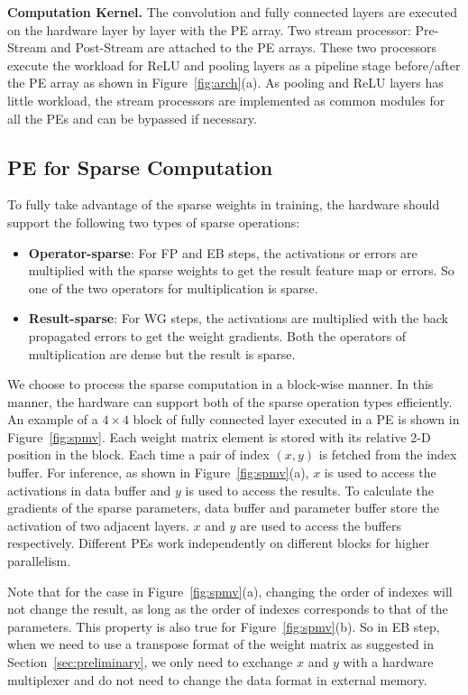 {\bf Computation Kernel.} The convolution and fully connected layers are executed on the hardware layer by layer with the PE array. Two stream processor: Pre-Stream and Post-Stream are attached to the PE arrays. These two processors execute the workload for ReLU and pooling layers as a pipeline stage before/after the PE array as shown in Figure~\ref{fig:arch}(a). As pooling and ReLU layers has little workload, the stream processors are implemented as common modules for all the PEs and can be bypassed if necessary.

\subsection{PE for Sparse Computation}\label{sec:hw_pe}

To fully take advantage of the sparse weights in training, the hardware should support the following two types of sparse operations:
\begin{itemize}
\item {\bf Operator-sparse}: For FP and EB steps, the activations or errors are multiplied with the sparse weights to get the result feature map or errors. So one of the two operators for multiplication is sparse.
\item {\bf Result-sparse}: For WG steps, the activations are multiplied with the back propagated errors to get the weight gradients. Both the operators of multiplication are dense but the result is sparse.
\end{itemize}

We choose to process the sparse computation in a block-wise manner. In this manner, the hardware can support both of the sparse operation types efficiently. An example of a $4\times 4$ block of fully connected layer executed in a PE is shown in Figure~\ref{fig:spmv}. Each weight matrix element is stored with its relative 2-D position in the block. Each time a pair of index $(x, y)$ is fetched from the index buffer. For inference, as shown in Figure~\ref{fig:spmv}(a), $x$ is used to access the activations in data buffer and $y$ is used to access the results. To calculate the gradients of the sparse parameters, data buffer and parameter buffer store the activation of two adjacent layers. $x$ and $y$ are used to access the buffers respectively. Different PEs work independently on different blocks for higher parallelism.

Note that for the case in Figure~\ref{fig:spmv}(a), changing the order of indexes will not change the result, as long as the order of indexes corresponds to that of the parameters. This property is also true for Figure~\ref{fig:spmv}(b). So in EB step, when we need to use a transpose format of the weight matrix as suggested in Section~\ref{sec:preliminary}, we only need to exchange $x$ and $y$ with a hardware multiplexer and do not need to change the data format in external memory. 

